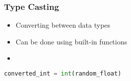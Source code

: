 \documentclass[serif, 9pt, aspectratio=32]{beamer}
\begin{document}
\begin{frame}
    \centering
    \frametitle{Type Casting}
    \begin{itemize}
        \setlength{\itemsep}{3em}
        \item Converting between data types
        \item Can be done using built-in functions
        \item
    \end{itemize}
\end{frame}

\begin{frame}[fragile]
    \begin{lstlisting}[language=Python]
        converted_int = int(random_float)
    \end{lstlisting}

\end{frame}
\end{document}
